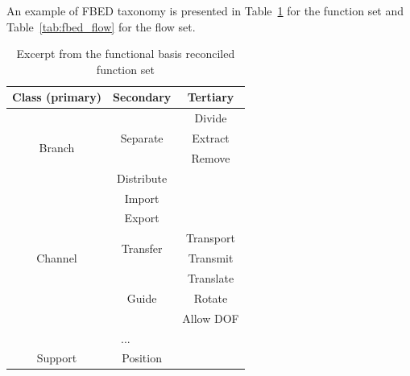 An example of FBED taxonomy is presented in Table~\ref{tab:fbed_func} for the function set and Table~\ref{tab:fbed_flow} for the flow set.
\renewcommand{\arraystretch}{1.2}
\begin{table}[t] \tiny
\centering
\caption{Excerpt from the functional basis reconciled function set}
\label{tab:fbed_func}
\begin{tabular}{|c|c|c|}
\hline
Class (primary)          & Secondary                 & Tertiary  \\ \hline
\multirow{4}{*}{Branch}  & \multirow{3}{*}{Separate} & Divide    \\ \cline{3-3} 
                         &                           & Extract   \\ \cline{3-3} 
                         &                           & Remove    \\ \cline{2-3} 
                         & Distribute                &           \\ \hline
\multirow{7}{*}{Channel} & Import                    &           \\ \cline{2-3} 
                         & Export                    &           \\ \cline{2-3} 
                         & \multirow{2}{*}{Transfer} & Transport \\ \cline{3-3} 
                         &                           & Transmit  \\ \cline{2-3} 
                         & \multirow{3}{*}{Guide}    & Translate \\ \cline{3-3} 
                         &                           & Rotate    \\ \cline{3-3} 
                         &                           & Allow DOF \\ \hline
\multicolumn{3}{|c|}{...}                                        \\ \hline
Support & Position &           \\ \hline
\end{tabular}
\end{table}

